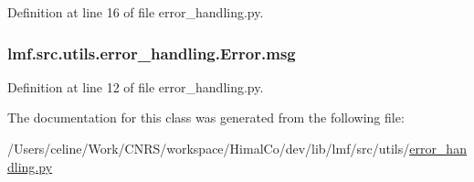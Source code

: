 Definition at line 16 of file error\+\_\+handling.\+py.

\hypertarget{classlmf_1_1src_1_1utils_1_1error__handling_1_1_error_ad949ea867656445f2db40f53c3369209}{
\subsubsection[{msg}]{\setlength{\rightskip}{0pt plus 5cm}lmf.\+src.\+utils.\+error\+\_\+handling.\+Error.\+msg}}\label{classlmf_1_1src_1_1utils_1_1error__handling_1_1_error_ad949ea867656445f2db40f53c3369209}


Definition at line 12 of file error\+\_\+handling.\+py.



The documentation for this class was generated from the following file\+:\begin{DoxyCompactItemize}
\item 
/\+Users/celine/\+Work/\+C\+N\+R\+S/workspace/\+Himal\+Co/dev/lib/lmf/src/utils/\hyperlink{error__handling_8py}{error\+\_\+handling.\+py}\end{DoxyCompactItemize}
